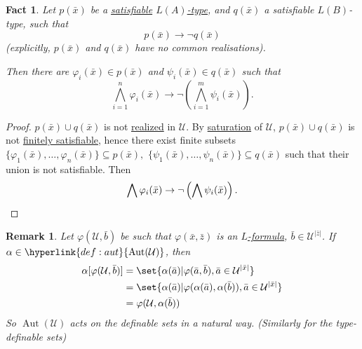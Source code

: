 \documentclass{article}
\DeclareMathOperator{\Aut}{Aut}
\newtheorem{nremark}[nthm]{Remark}
\newtheorem{nfact}[nthm]{Fact}
\begin{document}
\begin{nfact}\label{fact:7.2}
  Let $p(\bar{x})$ be a \hyperlink{def:type}{satisfiable} \hyperlink{def:typeparam}{$L(A)$-type}, and $q(\bar{x})$ a satisfiable $L(B)$-type, such that
  \begin{equation*}p(\bar{x})\to \lnot q(\bar{x})\end{equation*}
  (explicitly, $p(\bar{x})$ and $q(\bar{x})$ have no common realisations).

  Then there are $\varphi_i(\bar{x}) \in p(\bar{x})$ and $\psi_i(\bar{x}) \in q(\bar{x})$ such that
  \begin{equation*} \bigwedge_{i=1}^n\varphi_i(\bar{x})\to \lnot \left(\bigwedge_{i=1}^m\psi_i(\bar{x})\right).\end{equation*}
\end{nfact}
\begin{proof}
  $p(\bar{x})\cup q(\bar{x})$ is not \hyperlink{def:type}{realized} in $\mathcal{U}$.
  By \hyperlink{def:sat}{saturation} of $\mathcal{U}$, $p(\bar{x}) \cup q(\bar{x})$ is not \hyperlink{def:type}{finitely satisfiable},
  hence there exist finite subsets
  $\{\varphi_1(\bar{x}), \dotsc, \varphi_n(\bar{x})\} \subseteq p(\bar{x}),$
  $\{\psi_1(\bar{x}), \dotsc, \psi_n(\bar{x})\}\subseteq q(\bar{x})$
  such that their union is not satisfiable.
  Then
  \begin{equation*} \bigwedge \varphi_i(\bar{x}) \to \lnot\left(\bigwedge \psi_i(\bar{x}) \right). \qedhere \end{equation*}
\end{proof}
\begin{nremark}\label{rem:7.3}
  Let $ \varphi(\mathcal{U},\bar{b}) $ be such that $\varphi(\bar{x},\bar{z})$ is an \hyperlink{def:form}{$L$-formula}, $\bar{b}\in \mathcal{U}^{|\bar{z}|} $.
  If $ \alpha\in\hyperlink{def:aut}{\Aut(\mathcal{U})} $, then
  \begin{align*}
    \alpha[\varphi(\mathcal{U},\bar{b})] &= \set{\alpha(\bar{a})|\varphi(\bar{a},\bar{b}), \bar{a} \in \mathcal{U}^{|\bar{x}|}}\\
                                         &= \set{\alpha(\bar{a})|\varphi(\alpha(\bar{a}),\alpha(\bar{b})), \bar{a} \in \mathcal{U}^{|\bar{x}|}}\\
                                         &= \varphi(\mathcal{U},\alpha(\bar{b}))
  \end{align*}
  So $\Aut(\mathcal{U})$ acts on the definable sets in a natural way. (Similarly for the type-definable sets)
\end{nremark}
\end{document}
